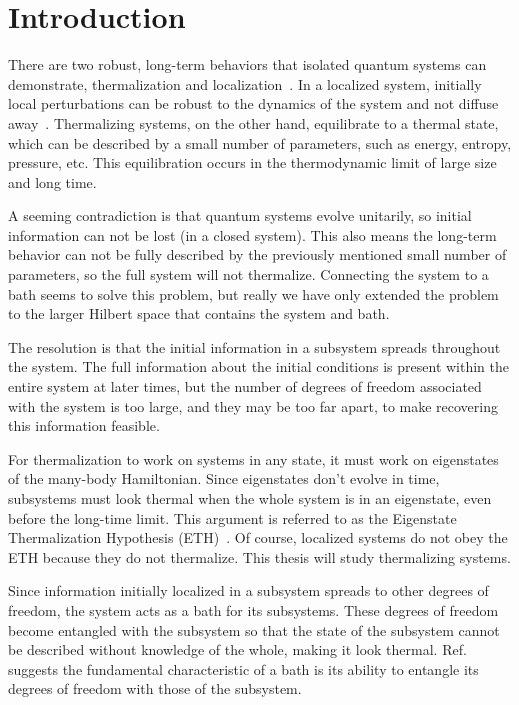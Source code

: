 \section{Introduction} \label{sec:intro}


There are two robust, long-term behaviors that isolated quantum systems can demonstrate, thermalization and localization~\cite{Nandkishore2015}. In a localized system, initially local perturbations can be robust to the dynamics of the system and not diffuse away~\cite{Anderson58}. Thermalizing systems, on the other hand, equilibrate to a thermal state, which can be described by a small number of parameters, such as energy, entropy, pressure, etc. This equilibration occurs in the thermodynamic limit of large size and long time. 

A seeming contradiction is that quantum systems evolve unitarily, so initial information can not be lost (in a closed system). This also means the long-term behavior can not be fully described by the previously mentioned small number of parameters, so the full system will not thermalize. Connecting the system to a bath seems to solve this problem, but really we have only extended the problem to the larger Hilbert space that contains the system and bath. 

The resolution is that the initial information in a subsystem spreads throughout the system. The full information about the initial conditions is present within the entire system at later times, but the number of degrees of freedom associated with the system is too large, and they may be too far apart, to make recovering this information feasible. 

For thermalization to work on systems in any state, it must work on eigenstates of the many-body Hamiltonian. Since eigenstates don't evolve in time, subsystems must look thermal when the whole system is in an eigenstate, even before the long-time limit. This argument is referred to as the Eigenstate Thermalization Hypothesis (ETH)~\cite{Deutsch91, Srednicki1994, Rigol2008, Nandkishore2015}. Of course, localized systems do not obey the ETH because they do not thermalize. This thesis will study thermalizing systems.

Since information initially localized in a subsystem spreads to other degrees of freedom, the system acts as a bath for its subsystems. These degrees of freedom become entangled with the subsystem so that the state of the subsystem cannot be described without knowledge of the whole, making it look thermal. Ref.~\cite{Nandkishore2015} suggests the fundamental characteristic of a bath is its ability to entangle its degrees of freedom with those of the subsystem.

